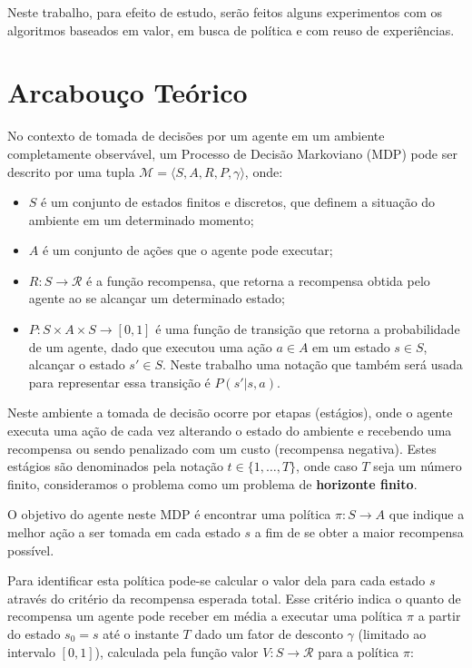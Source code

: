 \documentclass[letterpaper]{article}
\begin{document}
Neste trabalho, para efeito de estudo, serão feitos alguns experimentos com os algoritmos baseados em valor, em busca de política e com reuso de experiências.

\section{Arcabouço Teórico}

No contexto de tomada de decisões por um agente em um ambiente completamente observável, um Processo de Decisão Markoviano (MDP) pode ser descrito por uma tupla $\mathcal{M}=\langle S,A,R,P,\gamma \rangle$, onde:

\begin{itemize}
    \item $S$ é um conjunto de estados finitos e discretos, que definem a situação do ambiente em um determinado momento;
    \item $A$ é um conjunto de ações que o agente pode executar;
    \item $R : S \rightarrow \mathcal{R} $ é a função recompensa, que retorna a recompensa obtida pelo agente ao se alcançar um determinado estado;
    \item $P : S \times A \times S \rightarrow [0, 1]$ é uma função de transição que retorna a probabilidade de um agente, dado que executou uma ação $a \in A$ em um estado $s \in S$, alcançar o estado $s' \in S$. Neste trabalho uma notação que também será usada para representar essa transição é $P(s'|s,a)$.
\end{itemize}

Neste ambiente a tomada de decisão ocorre por etapas (estágios), onde o agente executa uma ação de cada vez alterando o estado do ambiente e recebendo uma recompensa ou sendo penalizado com um custo (recompensa negativa). Estes estágios são denominados pela notação $t \in \{ 1, \dots, T \} $, onde caso $T$ seja um número finito, consideramos o problema como um problema de \textbf{horizonte finito}.

O objetivo do agente neste MDP é encontrar uma política $\pi : S \rightarrow A$ que indique a melhor ação a ser tomada em cada estado $s$ a fim de se obter a maior recompensa possível.

Para identificar esta política pode-se calcular o valor dela para cada estado $s$ através do critério da recompensa esperada total. Esse critério indica o quanto de recompensa um agente pode receber em média a executar uma política $\pi$ a partir do estado $s_0 = s$ até o instante $T$ dado um fator de desconto $\gamma$ (limitado ao intervalo $[0, 1]$), calculada pela função valor $V : S \rightarrow \mathcal{R} $ para a política $\pi$:
\end{document}
